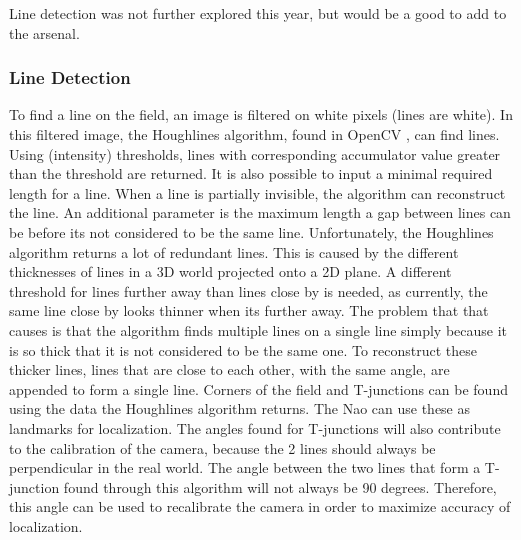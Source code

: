 \documentclass[a4paper]{article}
\begin{document}
Line detection was not further explored this year, but would be a good to add to the arsenal.


\subsubsection{Line Detection}
To find a line on the field, an image is filtered on white pixels (lines are white). In this filtered image, the Houghlines algorithm, found in OpenCV \cite[p.~156]{Bradski2008}, can find lines. Using (intensity) thresholds, lines with corresponding accumulator value greater than the threshold are returned. It is also possible to input a minimal required length for a line. When a line is partially invisible, the algorithm can reconstruct the line. An additional parameter is the maximum length a gap between lines can be before its not considered to be the same line. 
Unfortunately, the Houghlines algorithm returns a lot of redundant lines. This is caused by the different thicknesses of lines in a 3D world projected onto a 2D plane. A different threshold for lines further away than lines close by is needed, as currently, the same line close by looks thinner when its further away. The problem that that causes is that the algorithm finds multiple lines on a single line simply because it is so thick that it is not considered to be the same one. To reconstruct these thicker lines, lines that are close to each other, with the same angle, are appended to form a single line. 
Corners of the field and T-junctions can be found using the data the Houghlines algorithm returns. The Nao can use these as landmarks for localization. The angles found for T-junctions will also contribute to the calibration of the camera, because the 2 lines should always be perpendicular in the real world. The angle between the two lines that form a T-junction found through this algorithm will not always be 90 degrees. Therefore, this angle can be used to recalibrate the camera in order to maximize accuracy of localization. 
\end{document}
